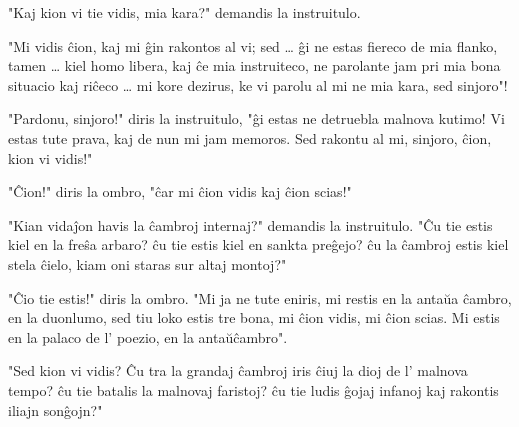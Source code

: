 \documentclass[ngerman,12pt,twoside]{book}
\begin{document}
"Kaj kion vi tie vidis, mia kara?" demandis la instruitulo.

"Mi vidis ĉion, kaj mi ĝin rakontos al vi; sed \ldots{} ĝi ne estas fiereco de mia flanko, tamen \ldots{} kiel homo libera, kaj ĉe mia instruiteco, ne parolante jam pri mia bona situacio kaj riĉeco \ldots{} mi kore dezirus, ke vi parolu al mi ne \glqq{}mia kara\grqq{}, sed \glqq{}sinjoro\grqq{}"!

"Pardonu, sinjoro!" diris la instruitulo, "ĝi estas ne detruebla malnova kutimo! Vi estas tute prava, kaj de nun mi jam memoros. Sed rakontu al mi, sinjoro, ĉion, kion vi vidis!"

"Ĉion!" diris la ombro, "ĉar mi ĉion vidis kaj ĉion scias!"

"Kian vidaĵon havis la ĉambroj internaj?" demandis la instruitulo. "Ĉu tie estis kiel en la freŝa arbaro? ĉu tie estis kiel en sankta preĝejo? ĉu la ĉambroj estis kiel stela ĉielo, kiam oni staras sur altaj montoj?"

"Ĉio tie estis!" diris la ombro. "Mi ja ne tute eniris, mi restis en la antaŭa ĉambro, en la duonlumo, sed tiu loko estis tre bona, mi ĉion vidis, mi ĉion scias. Mi estis en la palaco de l' poezio, en la antaŭĉambro".

"Sed kion vi vidis? Ĉu tra la grandaj ĉambroj iris ĉiuj la dioj de l' malnova tempo? ĉu tie batalis la malnovaj faristoj? ĉu tie ludis ĝojaj infanoj kaj rakontis iliajn sonĝojn?"
\end{document}
